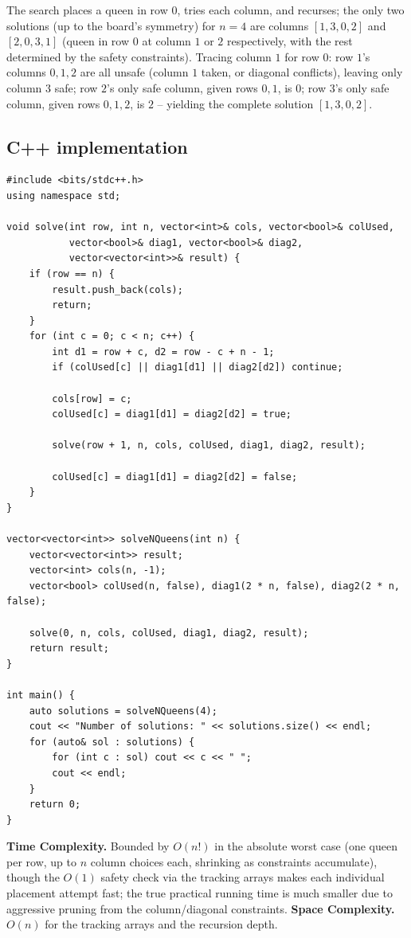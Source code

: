 The search places a queen in row $0$, tries each column, and recurses;
the only two solutions (up to the board's symmetry) for $n=4$ are
columns $[1,3,0,2]$ and $[2,0,3,1]$ (queen in row $0$ at column $1$ or
$2$ respectively, with the rest determined by the safety constraints).
Tracing column $1$ for row $0$: row $1$'s columns $0,1,2$ are all
unsafe (column $1$ taken, or diagonal conflicts), leaving only column
$3$ safe; row $2$'s only safe column, given rows $0,1$, is $0$; row
$3$'s only safe column, given rows $0,1,2$, is $2$ -- yielding the
complete solution $[1,3,0,2]$.

\subsection*{C++ implementation}

\begin{lstlisting}
#include <bits/stdc++.h>
using namespace std;

void solve(int row, int n, vector<int>& cols, vector<bool>& colUsed,
           vector<bool>& diag1, vector<bool>& diag2,
           vector<vector<int>>& result) {
    if (row == n) {
        result.push_back(cols);
        return;
    }
    for (int c = 0; c < n; c++) {
        int d1 = row + c, d2 = row - c + n - 1;
        if (colUsed[c] || diag1[d1] || diag2[d2]) continue;

        cols[row] = c;
        colUsed[c] = diag1[d1] = diag2[d2] = true;

        solve(row + 1, n, cols, colUsed, diag1, diag2, result);

        colUsed[c] = diag1[d1] = diag2[d2] = false;
    }
}

vector<vector<int>> solveNQueens(int n) {
    vector<vector<int>> result;
    vector<int> cols(n, -1);
    vector<bool> colUsed(n, false), diag1(2 * n, false), diag2(2 * n, false);

    solve(0, n, cols, colUsed, diag1, diag2, result);
    return result;
}

int main() {
    auto solutions = solveNQueens(4);
    cout << "Number of solutions: " << solutions.size() << endl;
    for (auto& sol : solutions) {
        for (int c : sol) cout << c << " ";
        cout << endl;
    }
    return 0;
}
\end{lstlisting}

\begin{complexitybox}
\textbf{Time Complexity.} Bounded by $O(n!)$ in the absolute worst case
(one queen per row, up to $n$ column choices each, shrinking as
constraints accumulate), though the $O(1)$ safety check via the
tracking arrays makes each individual placement attempt fast; the true
practical running time is much smaller due to aggressive pruning from
the column/diagonal constraints.
\textbf{Space Complexity.} $O(n)$ for the tracking arrays and the
recursion depth.
\end{complexitybox}

